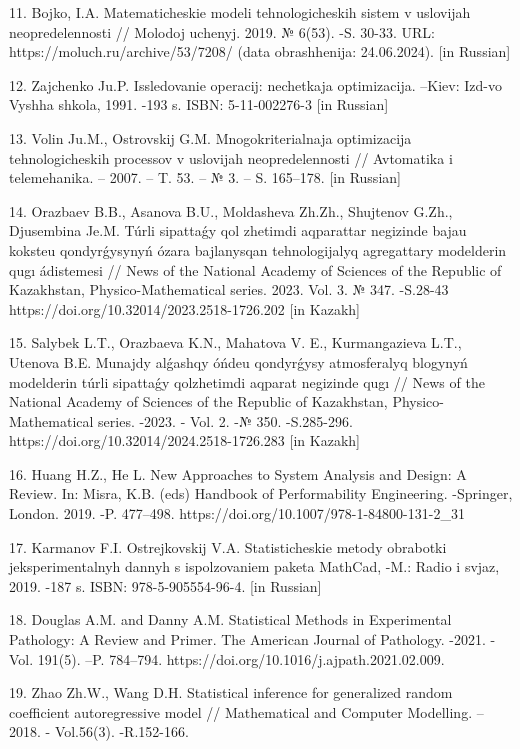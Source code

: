 \begin{noparindent}
11. Bojko, I.A. Matematicheskie modeli tehnologicheskih sistem v
uslovijah neopredelennosti // Molodoj uchenyj. 2019. № 6(53). -S. 30-33.
URL: https://moluch.ru/archive/53/7208/ (data obrashhenija: 24.06.2024).
{[}in Russian{]}

12. Zajchenko Ju.P. Issledovanie operacij: nechetkaja optimizacija.
--Kiev: Izd-vo Vyshha shkola, 1991. -193 s. ISBN: 5-11-002276-3 {[}in
Russian{]}

13. Volin Ju.M., Ostrovskij G.M. Mnogokriterial\textquotesingle naja
optimizacija tehnologicheskih processov v uslovijah neopredelennosti //
Avtomatika i telemehanika. -- 2007. -- T. 53. -- № 3. -- S. 165--178.
{[}in Russian{]}

14. Orazbaev B.B., Asanova B.U., Moldasheva Zh.Zh., Shujtenov G.Zh.,
Djusembina Je.M. Túrli sipattaǵy qol zhetimdi aqparattar negizinde bajau
koksteu qondyrǵysynyń ózara bajlanysqan tehnologijalyq agregattary
model\textquotesingle derin qugı ádistemesi // News of the National
Academy of Sciences of the Republic of Kazakhstan, Physico-Mathematical
series. 2023. Vol. 3. № 347. -S.28-43
https://doi.org/10.32014/2023.2518-1726.202 {[}in Kazakh{]}

15. Salybek L.T., Orazbaeva K.N., Mahatova V. E., Kurmangazieva L.T.,
Utenova B.E. Munajdy alǵashqy óńdeu qondyrǵysy atmosferalyq blogynyń
model\textquotesingle derin túrli sipattaǵy qolzhetimdi aqparat
negizinde qugı // News of the National Academy of Sciences of the
Republic of Kazakhstan, Physico-Mathematical series. -2023. - Vol. 2. -№
350. -S.285-296. https://doi.org/10.32014/2024.2518-1726.283 {[}in
Kazakh{]}

16. Huang H.Z., He L. New Approaches to System Analysis and Design: A
Review. In: Misra, K.B. (eds) Handbook of Performability Engineering.
-Springer, London. 2019. -P. 477--498.
https://doi.org/10.1007/978-1-84800-131-2\_31

17. Karmanov F.I. Ostrejkovskij V.A. Statisticheskie metody obrabotki
jeksperimental\textquotesingle nyh dannyh s
ispol\textquotesingle zovaniem paketa MathCad, -M.: Radio i
svjaz\textquotesingle, 2019. -187 s. ISBN: 978-5-905554-96-4. {[}in
Russian{]}

18. Douglas A.M. and Danny A.M. Statistical Methods in Experimental
Pathology: A Review and Primer. The American Journal of Pathology.
-2021. -Vol. 191(5). --P. 784--794.
https://doi.org/10.1016/j.ajpath.2021.02.009.

19. Zhao Zh.W., Wang D.H. Statistical inference for generalized random
coefficient autoregressive model // Mathematical and Computer Modelling.
-- 2018. - Vol.56(3). -R.152-166.


\end{noparindent}

